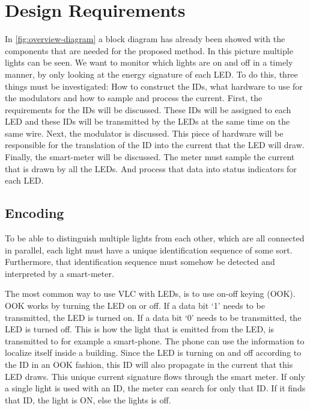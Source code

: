 
\chapter{Design Requirements}
\label{chp:design-requirements}



In \autoref{fig:overview-diagram} a block diagram has already been showed with the components that are needed for the proposed method.
In this picture multiple lights can be seen.
We want to monitor which lights are on and off in a timely manner, by only looking at the energy signature of each LED.
To do this, three things must be investigated: How to construct the IDs, what hardware to use for the modulators and how to sample and process the current.
First, the requirements for the IDs will be discussed.
These IDs will be assigned to each LED and these IDs will be transmitted by the LEDs at the same time on the same wire.
Next, the modulator is discussed. 
This piece of hardware will be responsible for the translation of the ID into the current that the LED will draw.
Finally, the smart-meter will be discussed.
The meter must sample the current that is drawn by all the LEDs.
And process that data into status indicators for each LED.








	\section{Encoding}

	To be able to distinguish multiple lights from each other, which are all connected in parallel, each light must have a unique identification sequence of some sort.
	Furthermore, that identification sequence must somehow be detected and interpreted by a smart-meter.


	The most common way to use VLC with LEDs, is to use on-off keying (OOK).
	OOK works by turning the LED on or off.
	If a data bit `1' needs to be transmitted, the LED is turned on.
	If a data bit `0' needs to be transmitted, the LED is turned off.
	This is how the light that is emitted from the LED, is transmitted to for example a smart-phone.
	The phone can use the information to localize itself inside a building.
	Since the LED is turning on and off according to the ID in an OOK fashion, this ID will also propagate in the current that this LED draws.
	This unique current signature flows through the smart meter.
	If only a single light is used with an ID, the meter can search for only that ID.
	If it finds that ID, the light is ON, else the lights is off.


